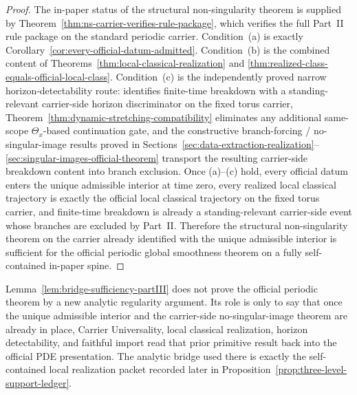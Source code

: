 \begin{proof}
The in-paper status of the structural non-singularity theorem is supplied by Theorem~\ref{thm:ns-carrier-verifies-rule-package}, which verifies the full Part~II rule package on the standard periodic carrier. Condition~(a) is exactly Corollary~\ref{cor:every-official-datum-admitted}. Condition~(b) is the combined content of Theorems~\ref{thm:local-classical-realization} and \ref{thm:realized-class-equals-official-local-class}. Condition~(c) is the independently proved narrow horizon-detectability route: \HorizonDetectabilityRef{} identifies finite-time breakdown with a standing-relevant carrier-side horizon discriminator on the fixed torus carrier, Theorem~\ref{thm:dynamic-stretching-compatibility} eliminates any additional same-scope $\Theta_x$-based continuation gate, and the constructive branch-forcing / no-singular-image results proved in Sections~\ref{sec:data-extraction-realization}--\ref{sec:singular-images-official-theorem} transport the resulting carrier-side breakdown content into branch exclusion. Once (a)--(c) hold, every official datum enters the unique admissible interior at time zero, every realized local classical trajectory is exactly the official local classical trajectory on the fixed torus carrier, and finite-time breakdown is already a standing-relevant carrier-side event whose branches are excluded by Part~II. Therefore the structural non-singularity theorem on the carrier already identified with the unique admissible interior is sufficient for the official periodic global smoothness theorem on a fully self-contained in-paper spine.
\end{proof}

\begin{remark}\label{rem:partIII-bridge-transport}
Lemma~\ref{lem:bridge-sufficiency-partIII} does not prove the official periodic theorem by a new
analytic regularity argument. Its role is only to say that once the unique admissible interior and the
carrier-side no-singular-image theorem are already in place, Carrier Universality, local classical
realization, horizon detectability, and faithful import read that prior primitive result back into the
official PDE presentation. The analytic bridge used there is exactly the self-contained local realization packet recorded later
in Proposition~\ref{prop:three-level-support-ledger}.
\end{remark}

